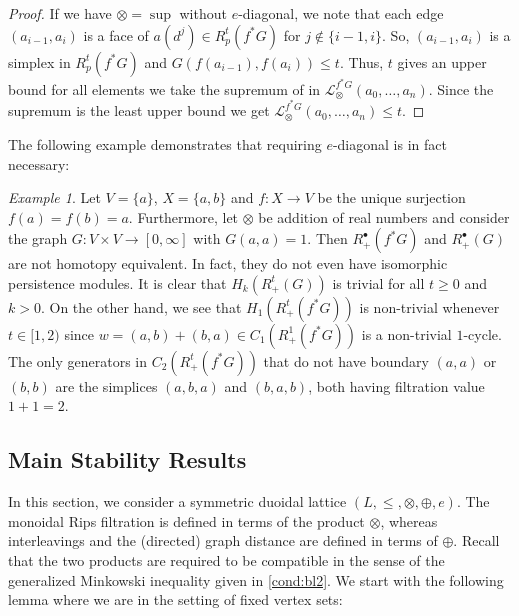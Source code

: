 \documentclass[a4paper,11pt]{article}
\newcommand{\tensor}{\otimes}
\newcommand{\atensor}{\oplus}
\newcounter{dummy}\numberwithin{dummy}{section}
\theoremstyle{remark}
\newtheorem{example}[dummy]{Example}
\begin{document}
\begin{proof}
    If we have $\tensor=\sup$ without $e$-diagonal, we note that each edge $(a_{i-1},a_{i})$ is a face of $a(d^j)\in R^t_p(f^*G)$ for $j\not\in \{i-1,i\}$. So, $(a_{i-1},a_{i})$ is a simplex in $R^t_p(f^*G)$ and $G(f(a_{i-1}),f(a_{i}))\leq t$. Thus, $t$ gives an upper bound for all elements we take the supremum of in $\mathcal{L}_\tensor^{f^*G}(a_0,\ldots, a_n)$. Since the supremum is the least upper bound we get $\mathcal{L}_\tensor^{f^*G}(a_0,\ldots, a_n)\leq t$. 
\end{proof}
The following example demonstrates that requiring $e$-diagonal is in fact necessary:
\begin{example}
Let $V=\{a\}$, $X=\{a,b\}$ and $f\colon X\to V$ be the unique surjection $f(a)=f(b)=a$. Furthermore, let $\tensor$ be addition of real numbers and consider the graph $G\colon V\times V\to [0,\infty]$ with $G(a,a)=1$. Then $R^\bullet_+(f^*G)$ and $R^\bullet_+(G)$ are not homotopy equivalent. In fact, they do not even have isomorphic persistence modules. It is clear that $H_k(R^t_+(G))$ is trivial for all $t\geq0$ and $k>0$. On the other hand, we see that $H_1(R^t_+(f^*G))$ is non-trivial whenever $t\in[1,2)$ since $w=(a,b)+(b,a)\in C_1(R^1_+(f^*G))$ is a non-trivial $1$-cycle. The only generators in $C_2(R^t_+(f^*G))$ that do not have boundary $(a,a)$ or $(b,b)$ are the simplices $(a,b,a)$ and $(b,a,b)$, both having filtration value $1+1=2$.
\end{example}

\subsection{Main Stability Results}\label{sec:main_stability_results}

In this section, we consider a symmetric duoidal lattice $(L,\leq,\tensor,\atensor,e)$. The monoidal Rips filtration is defined in terms of the product $\tensor$, whereas interleavings and the (directed) graph distance are defined in terms of $\atensor$. Recall that the two products are required to be compatible in the sense of the generalized Minkowski inequality given in \ref{cond:bl2}. We start with the following lemma where we are in the setting of fixed vertex sets:
\end{document}
